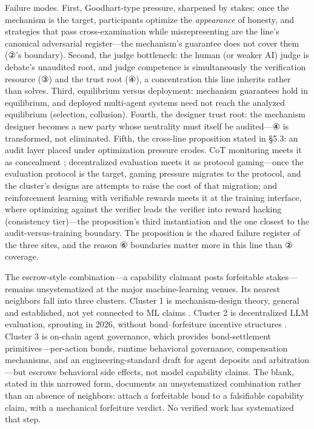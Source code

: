 \documentclass[11pt,a4paper]{article}
\begin{document}
Failure modes. First, Goodhart-type pressure, sharpened by stakes: once the mechanism is the target, participants optimize the \textit{appearance} of honesty, and strategies that pass cross-examination while misrepresenting are the line's canonical adversarial register—the mechanism's guarantee does not cover them (②'s boundary). Second, the judge bottleneck: the human (or weaker AI) judge is debate's unaudited root, and judge competence is simultaneously the verification resource (③) and the trust root (④), a concentration this line inherits rather than solves. Third, equilibrium versus deployment: mechanism guarantees hold in equilibrium, and deployed multi-agent systems need not reach the analyzed equilibrium (selection, collusion). Fourth, the designer trust root: the mechanism designer becomes a new party whose neutrality must itself be audited—④ is transformed, not eliminated. Fifth, the cross-line proposition stated in §5.3: an audit layer placed under optimization pressure erodes. CoT monitoring meets it as concealment \cite{key30}; decentralized evaluation meets it as protocol gaming—once the evaluation protocol is the target, gaming pressure migrates to the protocol, and the cluster's designs \cite{key44,key45,key46} are attempts to raise the cost of that migration; and reinforcement learning with verifiable rewards meets it at the training interface, where optimizing against the verifier leads the verifier into reward hacking \cite{key47} (consistency tier)—the proposition's third instantiation and the one closest to the audit-versus-training boundary. The proposition is the shared failure register of the three sites, and the reason ⑥ boundaries matter more in this line than ② coverage.

The escrow-style combination—a capability claimant posts forfeitable stakes—remains unsystematized at the major machine-learning venues. Its nearest neighbors fall into three clusters. Cluster 1 is mechanism-design theory, general and established, not yet connected to ML claims \cite{key43}. Cluster 2 is decentralized LLM evaluation, sprouting in 2026, without bond–forfeiture incentive structures \cite{key44,key45,key46}. Cluster 3 is on-chain agent governance, which provides bond-settlement primitives—per-action bonds, runtime behavioral governance, compensation mechanisms, and an engineering-standard draft for agent deposits and arbitration \cite{key48,key49,key50,key51}—but escrows behavioral side effects, not model capability claims. The blank, stated in this narrowed form, documents an unsystematized combination rather than an absence of neighbors: attach a forfeitable bond to a falsifiable capability claim, with a mechanical forfeiture verdict. No verified work has systematized that step.
\end{document}

